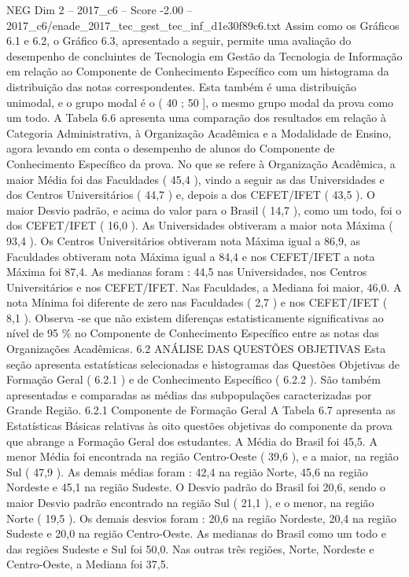 \begin{textsample}{NEG Dim 2 – 2017\_c6 – Score -2.00 – 2017\_c6/enade\_2017\_tec\_gest\_tec\_inf\_d1e30f89c6.txt}
Assim como os Gráficos 6.1 e 6.2, o Gráfico 6.3, apresentado a seguir, permite uma avaliação do desempenho de concluintes de Tecnologia em Gestão da Tecnologia de Informação em relação ao Componente de Conhecimento Específico com um histograma da distribuição das notas correspondentes.
Esta também é uma distribuição unimodal, e o grupo modal é o ( 40 ; 50 ], o mesmo grupo modal da prova como um todo.
A Tabela 6.6 apresenta uma comparação dos resultados em relação à Categoria Administrativa, à Organização Acadêmica e a Modalidade de Ensino, agora levando em conta o desempenho de alunos do Componente de Conhecimento Específico da prova.
No que se refere à Organização Acadêmica, a maior Média foi das Faculdades ( 45,4 ), vindo a seguir as das Universidades e dos Centros Universitários ( 44,7 ) e, depois a dos CEFET/IFET ( 43,5 ).
O maior Desvio padrão, e acima do valor para o Brasil ( 14,7 ), como um todo, foi o dos CEFET/IFET ( 16,0 ).
As Universidades obtiveram a maior nota Máxima ( 93,4 ).
Os Centros Universitários obtiveram nota Máxima igual a 86,9, as Faculdades obtiveram nota Máxima igual a 84,4 e nos CEFET/IFET a nota Máxima foi 87,4.
As medianas foram : 44,5 nas Universidades, nos Centros Universitários e nos CEFET/IFET.
Nas Faculdades, a Mediana foi maior, 46,0.
A nota Mínima foi diferente de zero nas Faculdades ( 2,7 ) e nos CEFET/IFET ( 8,1 ).
Observa -se que não existem diferenças estatisticamente significativas ao nível de 95 \% no Componente de Conhecimento Específico entre as notas das Organizações Acadêmicas. 6.2 ANÁLISE DAS QUESTÕES OBJETIVAS Esta seção apresenta estatísticas selecionadas e histogramas das Questões Objetivas de Formação Geral ( 6.2.1 ) e de Conhecimento Específico ( 6.2.2 ).
São também apresentadas e comparadas as médias das subpopulações caracterizadas por Grande Região. 6.2.1 Componente de Formação Geral A Tabela 6.7 apresenta as Estatísticas Básicas relativas às oito questões objetivas do componente da prova que abrange a Formação Geral dos estudantes.
A Média do Brasil foi 45,5.
A menor Média foi encontrada na região Centro-Oeste ( 39,6 ), e a maior, na região Sul ( 47,9 ).
As demais médias foram : 42,4 na região Norte, 45,6 na região Nordeste e 45,1 na região Sudeste.
O Desvio padrão do Brasil foi 20,6, sendo o maior Desvio padrão encontrado na região Sul ( 21,1 ), e o menor, na região Norte ( 19,5 ).
Os demais desvios foram : 20,6 na região Nordeste, 20,4 na região Sudeste e 20,0 na região Centro-Oeste.
As medianas do Brasil como um todo e das regiões Sudeste e Sul foi 50,0.
Nas outras três regiões, Norte, Nordeste e Centro-Oeste, a Mediana foi 37,5.

\end{textsample}
